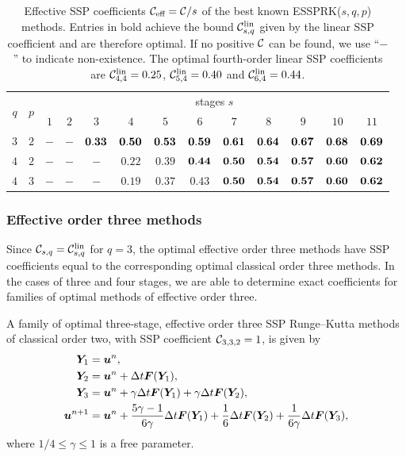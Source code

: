 \documentclass{siamltex}  %
\begin{document}
\begin{table}
\caption{Effective SSP coefficients $ \mathcal{C}_{\textnormal{eff}} = \mathcal{C}/s$ of the best known ESSPRK($s,q,p$) methods.
    		Entries in bold achieve the bound $\mathcal{C}^{\textnormal{lin}}_{s,q}$ given by the linear SSP coefficient and are therefore optimal. 
    		If no positive $\mathcal{C}$ can be found, we use ``$-$'' to indicate non-existence. 
    		The optimal fourth-order linear SSP coefficients are $\mathcal{C}^{\textnormal{lin}}_{4,4}=0.25$,
    		$\mathcal{C}^{\textnormal{lin}}_{5,4}=0.40$ and $\mathcal{C}^{\textnormal{lin}}_{6,4}=0.44$.}
    \centering
    \begin{tabular}{ccccccccccccc}
        \toprule
        \multirow{2}{*}{$q$} &
        \multirow{2}{*}{$p$}
            & \multicolumn{11}{c}{stages $s$} \\
            \cmidrule{3-13}
& & $1$ & $2$ & $3$ & $4$ & $5$ & $6$ & $7$ & $8$ & $9$ & $10$ & $11$ \\
        \midrule
        $3$ & $2$ & $-$ & $-$ & $\bf 0.33$ & $\bf 0.50$ & $\bf 0.53$ & $\bf 0.59$ & $\bf 0.61$ & $\bf 0.64$ & $\bf 0.67$ & $\bf 0.68$ & $\bf 0.69$\\
        $4$ & $2$ & $-$ & $-$ & $-$ & $0.22$ & $0.39$ & $\bf 0.44$ & $\bf 0.50$ & $\bf 0.54$ & $\bf 0.57$ & $\bf 0.60$ & $\bf 0.62$ \\
        $4$ & $3$ & $-$ & $-$ & $-$ & $0.19$ & $0.37$ & $0.43$ & $\bf 0.50$ & $\bf 0.54$ & $\bf 0.57$ & $\bf 0.60$ & $\bf 0.62$ \\
        \bottomrule
    \end{tabular}
    \label{tab:eff_SSP_coeff}
\end{table}

\subsubsection{Effective order three methods}\label{subsubsec:3rd_ESSPRK}
Since $\mathcal{C}_{s,q}=\mathcal{C}^{\textnormal{lin}}_{s,q}$ for $q=3$, the optimal effective order three methods
have SSP coefficients equal to the corresponding optimal classical order three methods.
In the cases of three and four stages, we are able to determine exact coefficients for
families of optimal methods of effective order three.
\begin{theorem}\label{thm:ESSPRK(3,3,2)}
	A family of optimal three-stage, effective order three SSP Runge--Kutta 
	methods of classical order two, with SSP coefficient $\mathcal{C}_{3,3,2} = 1$, is given by
    \begin{displaymath}
    		\begin{split}
    			\bm{Y}_1 &= \bm{u}^n, \\
    			\bm{Y}_2 &= \bm{u}^n + \Delta t\bm{F}(\bm{Y}_1), \\
    			\bm{Y}_3 &= \bm{u}^n + \gamma\Delta t\bm{F}(\bm{Y}_1) + \gamma\Delta t\bm{F}(\bm{Y}_2), \\
    			\bm{u}^{n+1} &= \bm{u}^n + \frac{5\gamma-1}{6\gamma}\Delta t\bm{F}(\bm{Y}_1) + \frac{1}{6}\Delta t\bm{F}(\bm{Y}_2) + \frac{1}{6\gamma}\Delta t\bm{F}(\bm{Y}_3),
        \end{split}
    \end{displaymath}
    where $1/4 \leq \gamma \leq 1$ is a free parameter.
\end{theorem}
\end{document}
